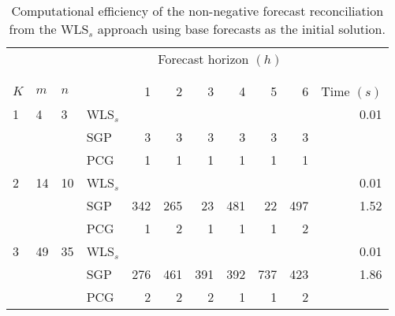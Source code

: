 \documentclass[11pt]{article}
\newcommand{\0}{\phantom{0}}
\begin{document}
\begin{table}[ht]
	\small
	\tabcolsep=0.20cm
	\caption{Computational efficiency of the non-negative forecast reconciliation from the WLS$_{s}$ approach using base forecasts as the initial solution.}
	\label{tbl:perfnnwlsb}
	\centering
	\begin{threeparttable}
		\begin{tabular}{llllrrrrrrr}
			\toprule
			    &        &        &           & \multicolumn{6}{c}{Forecast horizon $(h)$}                                                            \\[-0.3cm]\\\cline{5-10}\\[-0.3cm]
			$K$ & $m$    & $n$    &           & 1                                          & 2   & 3         & 4         & 5   & 6   & Time $(s)$     \\
			\midrule
			1   & 4      & 3      & WLS$_{s}$ &                                            &     &           &           &     &     & 0.01           \\
			    &        &        & SGP       & 3                                          & 3   & 3         & 3         & 3   & 3   & \bm{$0.04$}    \\
			    &        &        & PCG       & 1                                          & 1   & 1         & 1         & 1   & 1   & \bm{$0.04$}    \\
			\midrule
			2   & 14     & 10     & WLS$_{s}$ &                                            &     &           &           &     &     & 0.01           \\
			    &        &        & SGP       & 342                                        & 265 & 23        & 481       & 22  & 497 & 1.52           \\
			    &        &        & PCG       & 1                                          & 2   & 1         & 1         & 1   & 2   & \bm{$0.10$}    \\
			\midrule
			3   & 49     & 35     & WLS$_{s}$ &                                            &     &           &           &     &     & 0.01           \\
			    &        &        & SGP       & 276                                        & 461 & 391       & 392       & 737 & 423 & 1.86           \\
			    &        &        & PCG       & 2                                          & 2   & 2         & 1         & 1   & 2   & \bm{$0.17$}    \\

\end{tabular}
\end{threeparttable}
\end{table}
\end{document}
